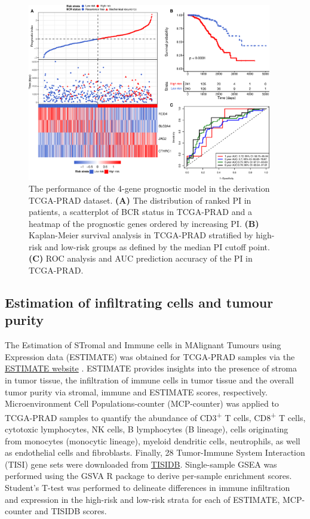 \documentclass[twocolumn]{bmcart}%
\begin{document}
\begin{figure}[ht!]
    \includegraphics[width=0.95\textwidth]{figures/TCGA_plots.png}
    \caption{The performance of the 4-gene prognostic model in the derivation TCGA-PRAD dataset. \textbf{(A)} The distribution of ranked PI in patients, a scatterplot of BCR status in TCGA-PRAD and a heatmap of the prognostic genes ordered by increasing PI. \textbf{(B)} Kaplan-Meier survival analysis in TCGA-PRAD stratified by high-risk and low-risk groups as defined by the median PI cutoff point. \textbf{(C)} ROC analysis and AUC prediction accuracy of the PI in TCGA-PRAD.}
    \label{fig:tcga_data}
\end{figure}

\subsection*{\textbf{Estimation of infiltrating cells and tumour purity}}
The Estimation of STromal and Immune cells in MAlignant Tumours using Expression data (ESTIMATE) was obtained for TCGA-PRAD samples via the \href{https://bioinformatics.mdanderson.org/estimate/}{ESTIMATE website} \cite{estimate}. ESTIMATE provides insights into the presence of stroma in tumor tissue, the infiltration of immune cells in tumor tissue and the overall tumor purity via stromal, immune and ESTIMATE scores, respectively. Microenvironment Cell Populations-counter (MCP-counter) was applied to TCGA-PRAD samples to quantify the abundance of CD3\textsuperscript{+} T cells, CD8\textsuperscript{+} T cells, cytotoxic lymphocytes, NK cells, B lymphocytes (B lineage), cells originating from monocytes (monocytic lineage), myeloid dendritic cells, neutrophils, as well as endothelial cells and fibroblasts. Finally, 28 Tumor-Immune System Interaction (TISI) gene sets were downloaded from \href{http://cis.hku.hk/TISIDB/index.php}{TISIDB}. Single-sample GSEA was performed using the GSVA R package \cite{GSVA} to derive per-sample enrichment scores. Student's T-test was performed to delineate differences in immune infiltration and expression in the high-risk and low-risk strata for each of ESTIMATE, MCP-counter and TISIDB scores. 
\end{document}
